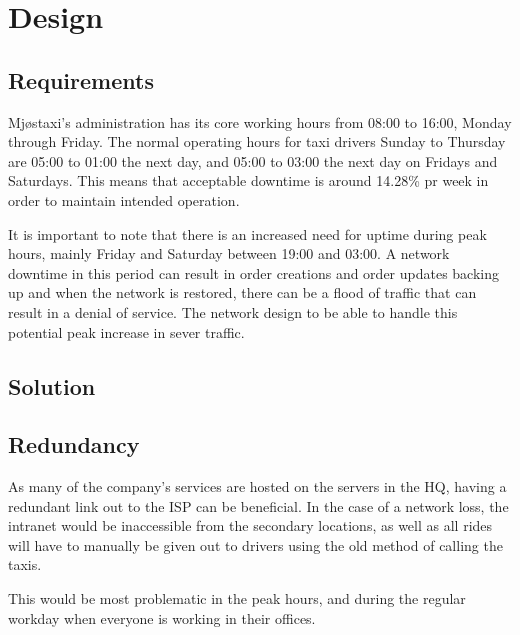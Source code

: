 \chapter{Design}
\label{chap:design}

\section{Requirements}
Mjøstaxi's administration has its core working hours from 08:00 to 16:00, Monday through Friday.
The normal operating hours for taxi drivers Sunday to Thursday are 05:00 to 01:00 the next day, and 05:00 to 03:00 the next day on Fridays and Saturdays. 
This means that acceptable downtime is around 14.28\% pr week in order to maintain intended operation. 

It is important to note that there is an increased need for uptime during peak hours, mainly Friday and Saturday between 19:00 and 03:00.
A network downtime in this period can result in order creations and order updates backing up and when the network is restored, there can be a flood of traffic that can result in a denial of service.
The network design to be able to handle this potential peak increase in sever traffic.



\section{Solution}



\section{Redundancy}
As many of the company's services are hosted on the servers in the HQ, having a redundant link out to the ISP can be beneficial.
In the case of a network loss, the intranet would be inaccessible from the secondary locations, as well as all rides will have to manually be given out to drivers using the old method of calling the taxis.

This would be most problematic in the peak hours, and during the regular workday when everyone is working in their offices.

